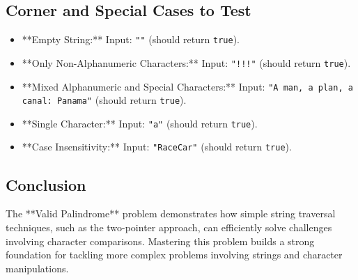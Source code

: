 \subsection*{Corner and Special Cases to Test}
\begin{itemize}
    \item **Empty String:** Input: \texttt{""} (should return \texttt{true}).
    \item **Only Non-Alphanumeric Characters:** Input: \texttt{"!!!"} (should return \texttt{true}).
    \item **Mixed Alphanumeric and Special Characters:** Input: \texttt{"A man, a plan, a canal: Panama"} (should return \texttt{true}).
    \item **Single Character:** Input: \texttt{"a"} (should return \texttt{true}).
    \item **Case Insensitivity:** Input: \texttt{"RaceCar"} (should return \texttt{true}).
\end{itemize}

\subsection*{Conclusion}
The **Valid Palindrome** problem demonstrates how simple string traversal techniques, such as the two-pointer approach, can efficiently solve challenges involving character comparisons. Mastering this problem builds a strong foundation for tackling more complex problems involving strings and character manipulations.